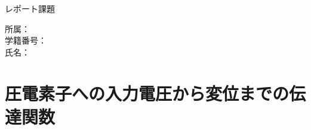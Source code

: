 \documentclass[a4j,11pt]{jarticle}
\begin{document}
\begin{center}
	\LARGE レポート課題 \\
\end{center}
\vspace{-6mm}
\begin{flushright}
	\Large 所属： \\
	\Large 学籍番号： \\
	\Large 氏名：
\end{flushright}





\vspace{-6mm}
\section{圧電素子への入力電圧から変位までの伝達関数}
\vspace{2mm}

\end{document}
